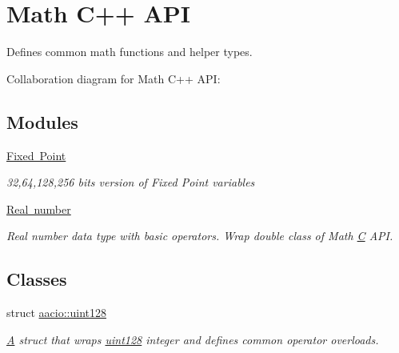 \hypertarget{group__mathcppapi}{}\section{Math C++ A\+PI}
\label{group__mathcppapi}


Defines common math functions and helper types.  


Collaboration diagram for Math C++ A\+PI\+:
\subsection*{Modules}
\begin{DoxyCompactItemize}
\item 
\mbox{\hyperlink{group__fixedpoint}{Fixed Point}}
\begin{DoxyCompactList}\small\item\em 32,64,128,256 bits version of Fixed Point variables \end{DoxyCompactList}\item 
\mbox{\hyperlink{group__real}{Real number}}
\begin{DoxyCompactList}\small\item\em Real number data type with basic operators. Wrap double class of Math \mbox{\hyperlink{struct_c}{C}} A\+PI. \end{DoxyCompactList}\end{DoxyCompactItemize}
\subsection*{Classes}
\begin{DoxyCompactItemize}
\item 
struct \mbox{\hyperlink{structaacio_1_1uint128}{aacio\+::uint128}}
\begin{DoxyCompactList}\small\item\em \mbox{\hyperlink{struct_a}{A}} struct that wraps \mbox{\hyperlink{structaacio_1_1uint128}{uint128}} integer and defines common operator overloads. \end{DoxyCompactList}\end{DoxyCompactItemize}
